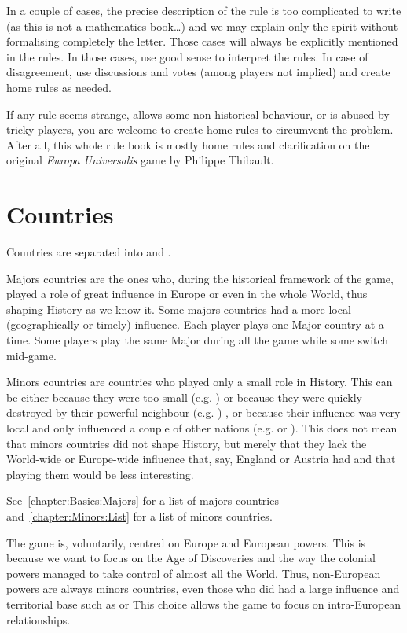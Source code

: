 \aparag In a couple of cases, the precise description of the rule is too
complicated to write (as this is not a mathematics book\ldots) and we may
explain only the spirit without formalising completely the letter. Those cases
will always be explicitly mentioned in the rules.
\bparag In those cases, use good sense to interpret the rules. In case of
disagreement, use discussions and votes (among players not implied) and create
home rules as needed.

\aparag If any rule seems strange, allows some non-historical behaviour, or is
abused by tricky players, you are welcome to create home rules to circumvent
the problem. After all, this whole rule book is mostly home rules and
clarification on the original \emph{Europa Universalis} game by Philippe
Thibault.


\section{Countries}

 Countries are separated into  and .

\aparag Majors countries are the ones who, during the historical framework of
the game, played a role of great influence in Europe or even in the whole
World, thus shaping History as we know it.
\bparag Some majors countries had a more local (geographically or timely)
influence.
\bparag Each player plays one Major country at a time. Some players play the
same Major during all the game while some switch mid-game.

\aparag Minors countries are countries who played only a small role in
History.
\bparag This can be either because they were too small (e.g. \paysCologne) or
because they were quickly destroyed by their powerful neighbour
(e.g. \paysDamas) , or because their influence was very local and only
influenced a couple of other nations (e.g. \paysPerse or \paysEcosse).
\bparag This does not mean that minors countries did not shape History, but
merely that they lack the World-wide or Europe-wide influence that, say,
England or Austria had and that playing them would be less interesting.

\aparag See~\ref{chapter:Basics:Majors} for a list of majors countries
and~\ref{chapter:Minors:List} for a list of minors countries.

 The game is, voluntarily, centred on Europe and
European powers. This is because we want to focus on the Age of Discoveries
and the way the colonial powers managed to take control of almost all the
World.
\bparag Thus, non-European powers are always minors countries, even those who
did had a large influence and territorial base such as \paysChine or
\paysMogol %
\bparag This choice allows the game to focus on intra-European relationships.





